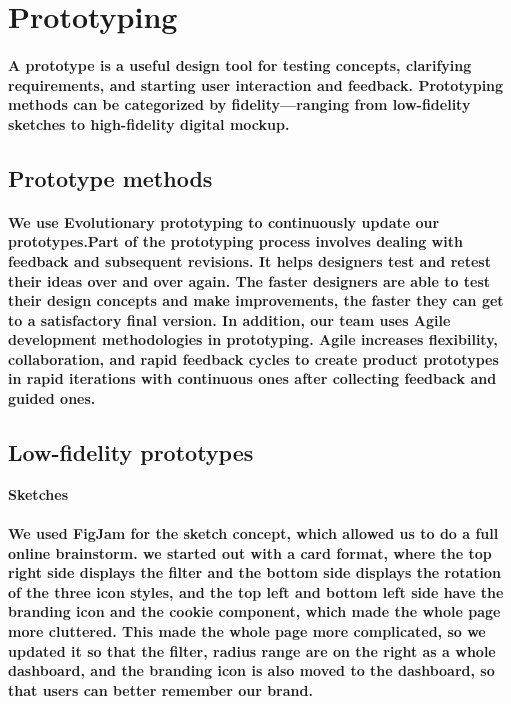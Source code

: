 \section{Prototyping}

\paragraph{A prototype is a useful design tool for testing concepts, clarifying requirements, and starting user interaction and feedback.
Prototyping methods can be categorized by fidelity—ranging from low-fidelity sketches to high-fidelity digital mockup.}


\subsection{Prototype methods}
\paragraph{We use Evolutionary prototyping to continuously update our prototypes.Part of the prototyping process involves dealing with feedback and subsequent revisions. It helps designers test and retest their ideas over and over again. The faster designers are able to test their design concepts and make improvements, the faster they can get to a satisfactory final version. In addition, our team uses Agile development methodologies in prototyping. Agile increases flexibility, collaboration, and rapid feedback cycles to create product prototypes in rapid iterations with continuous ones after collecting feedback and guided ones.}


\subsection{Low-fidelity prototypes}

\item \textbf{Sketches}
\paragraph{We used FigJam for the sketch concept, which allowed us to do a full online brainstorm. we started out with a card format, where the top right side displays the filter and the bottom side displays the rotation of the three icon styles, and the top left and bottom left side have the branding icon and the cookie component, which made the whole page more cluttered. This made the whole page more complicated, so we updated it so that the filter, radius range are on the right as a whole dashboard, and the branding icon is also moved to the dashboard, so that users can better remember our brand.}


